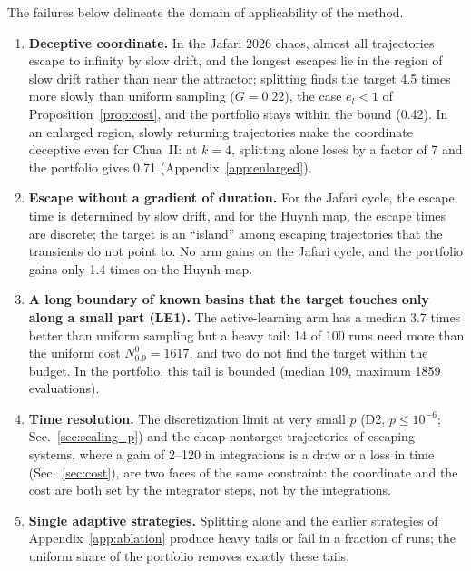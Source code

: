 The failures below delineate the domain of applicability of the method.
\begin{enumerate}
\item \textbf{Deceptive coordinate.} In the Jafari 2026 chaos, almost all trajectories escape to infinity by slow drift, and the longest escapes lie in the region of slow drift rather than near the attractor; splitting finds the target 4.5 times more slowly than uniform sampling ($G=0.22$), the case $e_l<1$ of Proposition~\ref{prop:cost}, and the portfolio stays within the bound (0.42). In an enlarged region, slowly returning trajectories make the coordinate deceptive even for Chua~II: at $k=4$, splitting alone loses by a factor of 7 and the portfolio gives 0.71 (Appendix~\ref{app:enlarged}).
\item \textbf{Escape without a gradient of duration.} For the Jafari cycle, the escape time is determined by slow drift, and for the Huynh map, the escape times are discrete; the target is an ``island'' among escaping trajectories that the transients do not point to. No arm gains on the Jafari cycle, and the portfolio gains only 1.4 times on the Huynh map.
\item \textbf{A long boundary of known basins that the target touches only along a small part (LE1).} The active-learning arm has a median 3.7 times better than uniform sampling but a heavy tail: 14 of 100 runs need more than the uniform cost $N^0_{0.9}=1617$, and two do not find the target within the budget. In the portfolio, this tail is bounded (median 109, maximum 1859 evaluations).
\item \textbf{Time resolution.} The discretization limit at very small $p$ (D2, $p\le10^{-6}$; Sec.~\ref{sec:scaling_p}) and the cheap nontarget trajectories of escaping systems, where a gain of 2--120 in integrations is a draw or a loss in time (Sec.~\ref{sec:cost}), are two faces of the same constraint: the coordinate and the cost are both set by the integrator steps, not by the integrations.
\item \textbf{Single adaptive strategies.} Splitting alone and the earlier strategies of Appendix~\ref{app:ablation} produce heavy tails or fail in a fraction of runs; the uniform share of the portfolio removes exactly these tails.
\end{enumerate}
